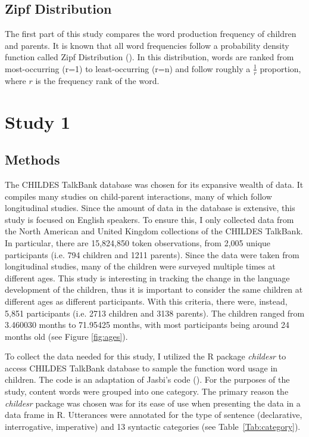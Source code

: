 \documentclass{article}
\theoremstyle{plain}
\theoremstyle{definition}
\theoremstyle{remark}
\numberwithin{equation}{section}
\begin{document}
\subsection{Zipf Distribution}
The first part of this study compares the word production frequency of children and parents. It is known that all word frequencies follow a probability density function called Zipf Distribution (\cite{tullo2003zipf}). In this distribution, words are ranked from most-occurring (r=1) to least-occurring (r=n) and follow roughly a $\frac{1}{r}$ proportion, where $r$ is the frequency rank of the word.


\section{Study 1}
\subsection{Methods}
The CHILDES TalkBank database was chosen for its expansive wealth of data. It compiles many studies on child-parent interactions, many of which follow longitudinal studies. Since the amount of data in the database is extensive, this study is focused on English speakers. To ensure this, I only collected data from the North American and United Kingdom collections of the CHILDES TalkBank. In particular, there are 15,824,850 token observations, from 2,005 unique participants (i.e. 794 children and 1211 parents). Since the data were taken from longitudinal studies, many of the children were surveyed multiple times at different ages. This study is interesting in tracking the change in the language development of the children, thus it is important to consider the same children at different ages as different participants. With this criteria, there were, instead, 5,851 participants (i.e. 2713 children and 3138 parents). The children ranged from 3.460030 months to 71.95425 months, with most participants being around 24 months old (see Figure \ref{fig:ages}). 

To collect the data needed for this study, I utilized the R package \emph{childesr} to access CHILDES TalkBank database \cite{macwhinney2000childes} to sample the function word usage in children. The code is an adaptation of Jasbi's code (\cite{masoud2022git}). For the purposes of the study, content words were grouped into one category. The primary reason the \emph{childesr} package was chosen was for its ease of use when presenting the data in a data frame in R. Utterances were annotated for the type of sentence (declarative, interrogative, imperative) and 13 syntactic categories (see Table~\ref{Tab:category}). 
\end{document}
